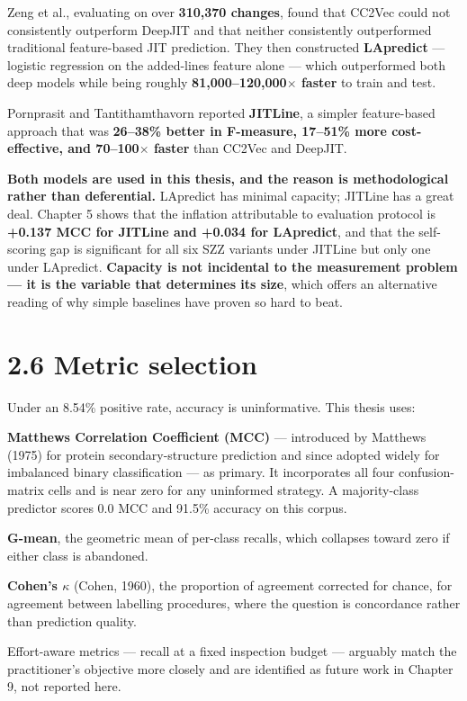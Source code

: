 Zeng et al., evaluating on over \textbf{310,370 changes}, found that
CC2Vec could not consistently outperform DeepJIT and that neither
consistently outperformed traditional feature-based JIT prediction. They
then constructed \textbf{LApredict} --- logistic regression on the
added-lines feature alone --- which outperformed both deep models while
being roughly \textbf{81,000--120,000\ensuremath{\times} faster} to train and test.

Pornprasit and Tantithamthavorn reported \textbf{JITLine}, a simpler
feature-based approach that was \textbf{26--38\% better in F-measure,
17--51\% more cost-effective, and 70--100\ensuremath{\times} faster} than CC2Vec and
DeepJIT.

\textbf{Both models are used in this thesis, and the reason is
methodological rather than deferential.} LApredict has minimal capacity;
JITLine has a great deal. Chapter 5 shows that the inflation
attributable to evaluation protocol is \textbf{+0.137 MCC for JITLine
and +0.034 for LApredict}, and that the self-scoring gap is significant
for all six SZZ variants under JITLine but only one under LApredict.
\textbf{Capacity is not incidental to the measurement problem --- it is
the variable that determines its size}, which offers an alternative
reading of why simple baselines have proven so hard to beat.

\section{2.6 Metric selection}\label{metric-selection}

Under an 8.54\% positive rate, accuracy is uninformative. This thesis
uses:

\textbf{Matthews Correlation Coefficient (MCC)} --- introduced by
Matthews (1975) for protein secondary-structure prediction and since
adopted widely for imbalanced binary classification --- as primary. It
incorporates all four confusion-matrix cells and is near zero for any
uninformed strategy. A majority-class predictor scores 0.0 MCC and
91.5\% accuracy on this corpus.

\textbf{G-mean}, the geometric mean of per-class recalls, which
collapses toward zero if either class is abandoned.

\textbf{Cohen's \ensuremath{\kappa}} (Cohen, 1960), the proportion of agreement corrected
for chance, for agreement between labelling procedures, where the
question is concordance rather than prediction quality.

Effort-aware metrics --- recall at a fixed inspection budget ---
arguably match the practitioner's objective more closely and are
identified as future work in Chapter 9, not reported here.

